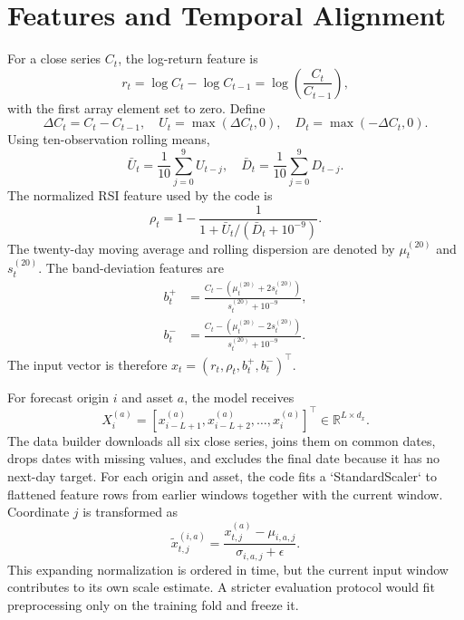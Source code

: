 \documentclass[10pt,a4paper,twocolumn]{article}
\newcommand{\R}{\mathbb{R}}
\begin{document}
\section{Features and Temporal Alignment}
For a close series $C_t$, the log-return feature is
\begin{equation}
r_t=\log C_t-\log C_{t-1}=\log\left(\frac{C_t}{C_{t-1}}\right),
\end{equation}
with the first array element set to zero. Define
\begin{equation}
\Delta C_t=C_t-C_{t-1},\quad U_t=\max(\Delta C_t,0),\quad D_t=\max(-\Delta C_t,0).
\end{equation}
Using ten-observation rolling means,
\begin{equation}
\bar U_t=\frac{1}{10}\sum_{j=0}^{9}U_{t-j},\quad
\bar D_t=\frac{1}{10}\sum_{j=0}^{9}D_{t-j}.
\end{equation}
The normalized RSI feature used by the code is
\begin{equation}
\rho_t=1-\frac{1}{1+\bar U_t/(\bar D_t+10^{-9})}.
\end{equation}
The twenty-day moving average and rolling dispersion are denoted by $\mu_t^{(20)}$ and $s_t^{(20)}$. The band-deviation features are
\begin{align}
b_t^+&=\frac{C_t-(\mu_t^{(20)}+2s_t^{(20)})}{s_t^{(20)}+10^{-9}},\\
b_t^-&=\frac{C_t-(\mu_t^{(20)}-2s_t^{(20)})}{s_t^{(20)}+10^{-9}}.
\end{align}
The input vector is therefore $x_t=(r_t,\rho_t,b_t^+,b_t^-)^\top$.

For forecast origin $i$ and asset $a$, the model receives
\begin{equation}
X_i^{(a)}=\left[x_{i-L+1}^{(a)},x_{i-L+2}^{(a)},\ldots,x_i^{(a)}\right]^\top\in\R^{L\times d_x}.
\end{equation}
The data builder downloads all six close series, joins them on common dates, drops dates with missing values, and excludes the final date because it has no next-day target. For each origin and asset, the code fits a `StandardScaler` to flattened feature rows from earlier windows together with the current window. Coordinate $j$ is transformed as
\begin{equation}
\widetilde{x}_{t,j}^{(i,a)}=\frac{x_{t,j}^{(a)}-\mu_{i,a,j}}{\sigma_{i,a,j}+\epsilon}.
\end{equation}
This expanding normalization is ordered in time, but the current input window contributes to its own scale estimate. A stricter evaluation protocol would fit preprocessing only on the training fold and freeze it.
\end{document}
